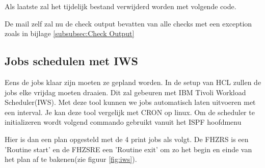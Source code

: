 
Als laatste zal het tijdelijk bestand verwijderd worden met volgende code.


De mail zelf zal nu de check output bevatten van alle checks met een exception zoals in bijlage \ref{subsubsec:Check Output}

\subsection{Jobs schedulen met IWS}
\label{subsec:Jobs schedulen met IWS}

Eens de jobs klaar zijn moeten ze gepland worden. In de setup van HCL zullen de jobs elke vrijdag moeten draaien. Dit zal gebeuren met IBM Tivoli Workload Scheduler(IWS). Met deze tool kunnen we jobs automatisch laten uitvoeren met een interval. Je kan deze tool vergelijk met CRON op linux. Om de scheduler te initializeren wordt volgend commando gebruikt vanuit het ISPF hoofdmenu


Hier is dan een plan opgesteld met de 4 print jobs als volgt. De FHZRS is een 'Routine start' en de FHZSRE een 'Routine exit' om zo het begin en einde van het plan af te
bakenen(zie figuur \ref{fig:iws}). 


